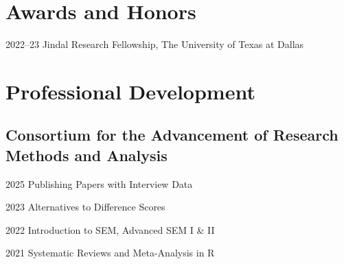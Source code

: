 \documentclass[12pt,letterpaper]{report} %
\begin{document}
    \section*{Awards and Honors} %


    \begin{tablist}

        \item[2022--23]\tab{}Jindal Research Fellowship, The University of Texas at Dallas

    \end{tablist}







    \section*{Professional Development}

    \subsection*{Consortium for the Advancement of Research Methods and Analysis}

    \begin{tablist}
    
        \item[2025]\tab{}Publishing Papers with Interview Data
        \item[2023]\tab{}Alternatives to Difference Scores
        \item[2022]\tab{}Introduction to SEM, Advanced SEM I \& II
        \item[2021]\tab{}Systematic Reviews and Meta-Analysis in R

    \end{tablist}
\end{document}
